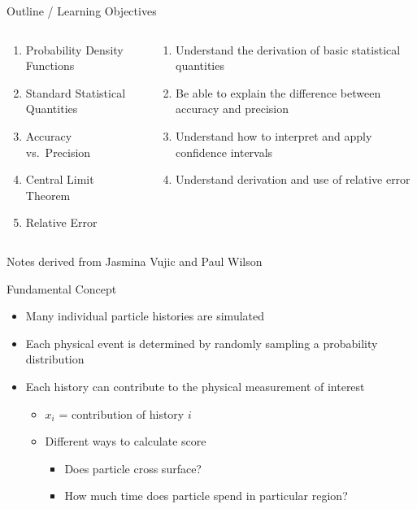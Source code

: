\documentclass[xcolor=x11names,compress, handout]{beamer}
\renewcommand{\(}{\begin{columns}}
\renewcommand{\)}{\end{columns}}
\newcommand{\<}[1]{\begin{column}{#1}}
\renewcommand{\>}{\end{column}}
\begin{document}
\begin{frame}{Outline / Learning Objectives}

\begin{columns}
  \begin{column}{0.5\textwidth}
    \begin{enumerate}
    \item Probability Density Functions
    \item Standard Statistical Quantities
    \item Accuracy vs.\ Precision
    \item Central Limit Theorem
    \item Relative Error
    \end{enumerate}
  \end{column}
  \begin{column}{0.5\textwidth}
    \begin{enumerate}
    \item Understand the derivation of basic statistical quantities
    \item Be able to explain the difference between accuracy and precision 
    \item Understand how to interpret and apply confidence intervals
    \item Understand derivation and use of relative error
    \end{enumerate}
  \end{column}
\end{columns}

\vspace*{1em}
Notes derived from Jasmina Vujic and Paul Wilson
\end{frame}


\begin{frame}{Fundamental Concept}

\begin{itemize}
  \item Many individual particle histories are simulated
  \item Each physical event is determined by
randomly sampling a \alert{probability distribution}
  \item Each history can contribute to the physical
measurement of interest
    \begin{itemize}
    \item $x_i$ = contribution of history $i$
    \item Different ways to calculate score
      \begin{itemize}
      \item Does particle cross surface?
      \item How much time does particle spend in particular region?
      \end{itemize}
    \end{itemize}
\end{itemize}
\end{frame}
\end{document}
